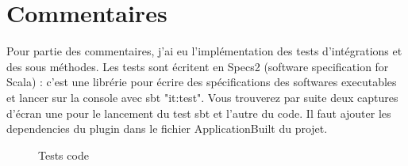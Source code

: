\documentclass[12pt,oneside,a4paper]{article}
\begin{document}
\section{Commentaires}
Pour partie des commentaires, j'ai eu l'implémentation des tests d'intégrations et des sous méthodes.
Les tests sont écritent en Specs2 (software specification for Scala) : c'est une librérie pour écrire des spécifications des softwares executables et lancer sur la console avec sbt "it:test".
Vous trouverez par suite deux captures d'écran une pour le lancement du test sbt et l'autre du code.
Il faut ajouter les dependencies du plugin dans le fichier ApplicationBuilt du projet.

\begin{figure}[H]
\begin{minipage}[c]{.7\linewidth}
\begin{center}
\caption{Tests code}
\label{fig:Tests code}
\end{center}
\end{minipage}
\hfill
\begin{minipage}[c]{.5\linewidth}
\begin{center}
\hspace{1em}

\end{center}
\end{minipage}
\end{figure}
\end{document}
